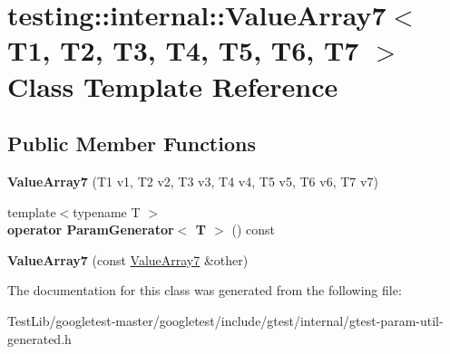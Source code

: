 \hypertarget{classtesting_1_1internal_1_1ValueArray7}{}\section{testing\+:\+:internal\+:\+:Value\+Array7$<$ T1, T2, T3, T4, T5, T6, T7 $>$ Class Template Reference}
\label{classtesting_1_1internal_1_1ValueArray7}
\subsection*{Public Member Functions}
\begin{DoxyCompactItemize}
\item 
\mbox{\label{classtesting_1_1internal_1_1ValueArray7_a34570dbbcc50d20f94e4a0c693e42f09}} 
{\bfseries Value\+Array7} (T1 v1, T2 v2, T3 v3, T4 v4, T5 v5, T6 v6, T7 v7)
\item 
\mbox{\label{classtesting_1_1internal_1_1ValueArray7_a4ab41f4a5687896e159c69f581d0a673}} 
{\footnotesize template$<$typename T $>$ }\\{\bfseries operator Param\+Generator$<$ T $>$} () const
\item 
\mbox{\label{classtesting_1_1internal_1_1ValueArray7_ab4be0da0f772c885c6fe681ea486ece4}} 
{\bfseries Value\+Array7} (const \hyperlink{classtesting_1_1internal_1_1ValueArray7}{Value\+Array7} \&other)
\end{DoxyCompactItemize}


The documentation for this class was generated from the following file\+:\begin{DoxyCompactItemize}
\item 
Test\+Lib/googletest-\/master/googletest/include/gtest/internal/gtest-\/param-\/util-\/generated.\+h\end{DoxyCompactItemize}
